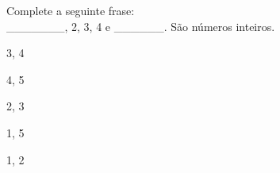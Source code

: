 \question[10]
Complete a seguinte frase:\\
_______, 2, 3, 4 e ______. São números inteiros.
\\
\begin{choices}
\item 3, 4 
\item 4, 5 
\item 2, 3
\item 1, 5 %
\item 1, 2 
\end{choices}
\answerline

